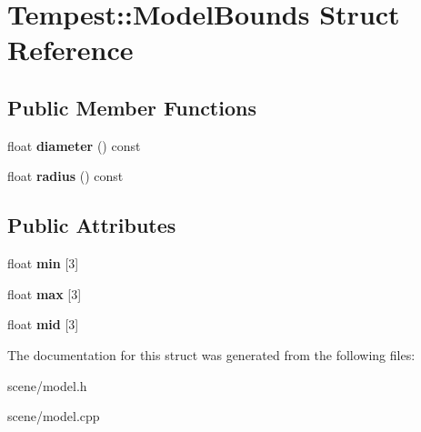 \hypertarget{struct_tempest_1_1_model_bounds}{\section{Tempest\+:\+:Model\+Bounds Struct Reference}
\label{struct_tempest_1_1_model_bounds}
}
\subsection*{Public Member Functions}
\begin{DoxyCompactItemize}
\item 
\hypertarget{struct_tempest_1_1_model_bounds_af56a2ca25e923d0986ba3d6d80177b42}{float {\bfseries diameter} () const }\label{struct_tempest_1_1_model_bounds_af56a2ca25e923d0986ba3d6d80177b42}

\item 
\hypertarget{struct_tempest_1_1_model_bounds_a0a1570f914547d59035ffa7538a643d5}{float {\bfseries radius} () const }\label{struct_tempest_1_1_model_bounds_a0a1570f914547d59035ffa7538a643d5}

\end{DoxyCompactItemize}
\subsection*{Public Attributes}
\begin{DoxyCompactItemize}
\item 
\hypertarget{struct_tempest_1_1_model_bounds_afcd0da5fe0be8195f184db02ec351500}{float {\bfseries min} \mbox{[}3\mbox{]}}\label{struct_tempest_1_1_model_bounds_afcd0da5fe0be8195f184db02ec351500}

\item 
\hypertarget{struct_tempest_1_1_model_bounds_a870dc0c987a754fd7fc71655eefc260d}{float {\bfseries max} \mbox{[}3\mbox{]}}\label{struct_tempest_1_1_model_bounds_a870dc0c987a754fd7fc71655eefc260d}

\item 
\hypertarget{struct_tempest_1_1_model_bounds_a88cc5797a42f0c8430cb25d1551f90aa}{float {\bfseries mid} \mbox{[}3\mbox{]}}\label{struct_tempest_1_1_model_bounds_a88cc5797a42f0c8430cb25d1551f90aa}

\end{DoxyCompactItemize}


The documentation for this struct was generated from the following files\+:\begin{DoxyCompactItemize}
\item 
scene/model.\+h\item 
scene/model.\+cpp\end{DoxyCompactItemize}
